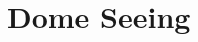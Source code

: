 \documentclass{gmto-book}
\begin{document}


\part{Dome Seeing}
\label{dome-seeing}










\printbibliography
\end{document}
